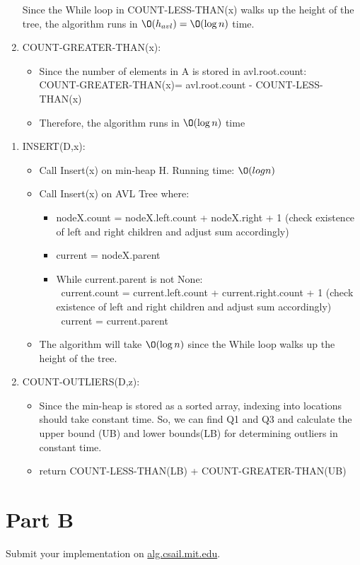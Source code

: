 \documentclass[12pt,twoside]{article}
\begin{document}
\begin{problems}
\begin{problemparts}
\begin{enumerate}
Since the While loop in COUNT-LESS-THAN(x) walks up the height of the tree, the algorithm runs in $\O(h_{avl})= \O(\log n)$ time.\\
\clearpage
\item COUNT-GREATER-THAN(x):
\begin{itemize}
	\item Since the number of elements in A is stored in avl.root.count:\\
	COUNT-GREATER-THAN(x)= avl.root.count - COUNT-LESS-THAN(x)
	\item Therefore, the algorithm runs in $\O(\log n)$ time
\end{itemize}

\end{enumerate}
\problempart 
\begin{enumerate}
	\item INSERT(D,x):
	\begin{itemize}
		\item Call Insert(x) on min-heap H. Running time: $ \O(log n) $
		\item Call Insert(x) on AVL Tree where:
		\begin{itemize}
			\item  nodeX.count = nodeX.left.count + nodeX.right + 1 (check existence of left and right children and adjust sum accordingly)
			\item current = nodeX.parent
			\item While current.parent is not None: \\
			\-\ current.count = current.left.count + current.right.count + 1 (check existence of left and right children and adjust sum accordingly)\\
			\-\ current = current.parent
		\end{itemize}
		\item The algorithm will take $\O(\log n) $ since the While loop walks up the height of the tree.
	\end{itemize}
\item COUNT-OUTLIERS(D,z):
\begin{itemize}
	\item Since the min-heap is stored as a sorted array, indexing into locations should take constant time. So, we can find Q1 and Q3 and calculate the upper bound (UB) and lower bounds(LB) for determining outliers in constant time. 
	\item return COUNT-LESS-THAN(LB) + COUNT-GREATER-THAN(UB)
\end{itemize}
\end{enumerate}
\end{problemparts}

\section*{Part B}

\problem
Submit your implementation on \url{alg.csail.mit.edu}.

\end{problems}
\end{document}
